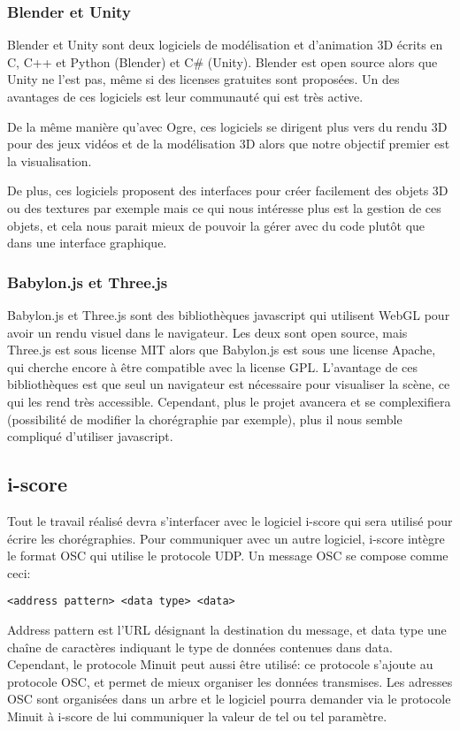 \subsubsection{Blender et Unity}

Blender et Unity sont deux logiciels de modélisation et d'animation 3D écrits en C, C++ et Python (Blender) et C\# (Unity). Blender est open source alors que Unity ne l'est pas, même si des licenses gratuites sont proposées. Un des avantages de ces logiciels est leur communauté qui est très active.

De la même manière qu'avec Ogre, ces logiciels se dirigent plus vers du rendu 3D pour des jeux vidéos et de la modélisation 3D alors que notre objectif premier est la visualisation. 

De plus, ces logiciels proposent des interfaces pour créer facilement des objets 3D ou des textures par exemple mais ce qui nous intéresse plus est la gestion de ces objets, et cela nous parait mieux de pouvoir la gérer avec du code plutôt que dans une interface graphique. 
				

\subsubsection{Babylon.js et Three.js}

Babylon.js et Three.js sont des bibliothèques javascript qui utilisent WebGL pour avoir un rendu visuel dans le navigateur. Les deux sont open source, mais Three.js est sous license MIT alors que Babylon.js est sous une license Apache, qui cherche encore à être compatible avec la license GPL. L'avantage de ces bibliothèques est que seul un navigateur est nécessaire pour visualiser la scène, ce qui les rend très accessible. Cependant, plus le projet avancera et se complexifiera (possibilité de modifier la chorégraphie par exemple), plus il nous semble compliqué d'utiliser javascript.



\subsection{i-score}

Tout le travail réalisé devra s'interfacer avec le logiciel i-score qui sera utilisé pour écrire les chorégraphies. Pour communiquer avec un autre logiciel, i-score intègre le format OSC qui utilise le protocole UDP. Un message OSC se compose comme ceci:
\begin{lstlisting}
<address pattern> <data type> <data>
\end{lstlisting}
Address pattern est l'URL désignant la destination du message, et data type une chaîne de caractères indiquant le type de données contenues dans data.
Cependant, le protocole Minuit peut aussi être utilisé: ce protocole s'ajoute au protocole OSC, et permet de mieux organiser les données transmises. Les adresses OSC sont organisées dans un arbre et le logiciel pourra demander via le protocole Minuit à i-score de lui communiquer la valeur de tel ou tel paramètre.  


